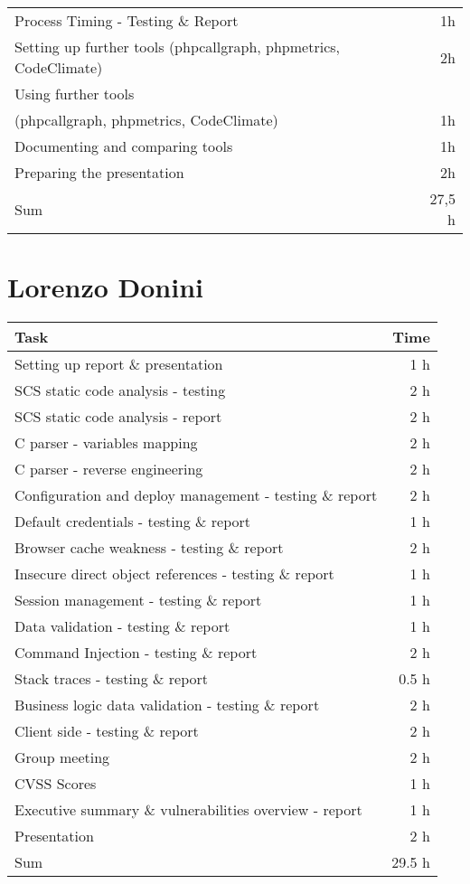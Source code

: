 \begin{table}[h!tpb]
\begin{tabularx}{\textwidth}{X r}
    Process Timing - Testing \& Report & 1h \\
    Setting up further tools (phpcallgraph, phpmetrics, CodeClimate) & 2h \\
    Using further tools\\(phpcallgraph, phpmetrics, CodeClimate) & 1h \\
    Documenting and comparing tools & 1h \\
    Preparing the presentation & 2h \\
    \midrule
      Sum & 27,5 h \\    
    \bottomrule
  \end{tabularx}
\end{table}

\clearpage
\section*{Lorenzo Donini}
\begin{table}[h!tpb]
  \centering
  \begin{tabularx}{\textwidth}{X r}
    \toprule
      Task & Time \\
    \midrule
      Setting up report \& presentation & 1 h \\
      SCS static code analysis - testing & 2 h \\
      SCS static code analysis - report & 2 h \\
      C parser - variables mapping & 2 h \\
      C parser - reverse engineering & 2 h \\
      Configuration and deploy management - testing \& report & 2 h \\
      Default credentials - testing \& report & 1 h \\
      Browser cache weakness - testing \& report & 2 h \\
      Insecure direct object references - testing \& report & 1 h \\
      Session management - testing \& report & 1 h \\
      Data validation - testing \& report & 1 h \\
      Command Injection - testing \& report & 2 h \\
      Stack traces - testing \& report & 0.5 h \\
      Business logic data validation - testing \& report & 2 h \\
      Client side - testing \& report & 2 h \\
      Group meeting & 2 h \\
      CVSS Scores & 1 h \\
      Executive summary \& vulnerabilities overview - report & 1 h \\
      Presentation & 2 h \\
    \midrule
      Sum & 29.5 h \\
    \bottomrule
  \end{tabularx}
\end{table}

